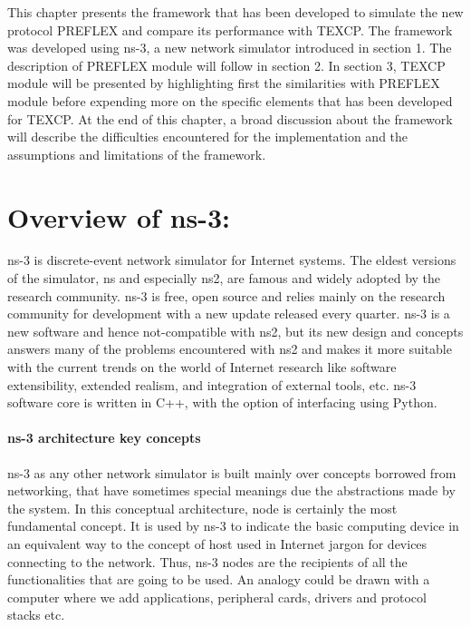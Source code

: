 This chapter presents the framework that has been developed to simulate the new protocol PREFLEX and compare its performance with TEXCP. The framework was developed using ns-3, a new network simulator introduced in section 1. The description of PREFLEX module will follow in section 2. In section 3, TEXCP module will be presented by highlighting first the similarities with PREFLEX module before expending more on the specific elements that has been developed for TEXCP. At the end of this chapter, a broad discussion about the framework will describe the difficulties encountered for the implementation and the assumptions and limitations of the framework.

\section{Overview of ns-3:}

ns-3 is discrete-event network simulator for Internet systems. The eldest versions of the simulator, ns and especially ns2, are famous and widely adopted by the research community.  ns-3  is free, open source and relies mainly on the research community for development with a new update released every quarter. ns-3 is a new software and hence not-compatible with ns2, but its new design and concepts answers many of the problems encountered with ns2 and makes it more suitable with the current trends on the world of Internet research like software extensibility, extended realism, and integration of external tools, etc.  ns-3 software core is written in C++, with the option of interfacing using Python. 

\paragraph{ns-3 architecture key concepts}

ns-3 as any other network simulator is built mainly over concepts borrowed from networking, that  have sometimes special meanings due the abstractions made by the system. In this conceptual architecture, node is certainly the most fundamental concept. It is used by ns-3 to indicate the basic computing device in an  equivalent way to the concept of host used in Internet jargon for devices connecting to the network. Thus, ns-3 nodes are the recipients of all the functionalities that are going to be used. An analogy could be drawn with a computer where we add applications, peripheral cards, drivers and protocol stacks etc. 

